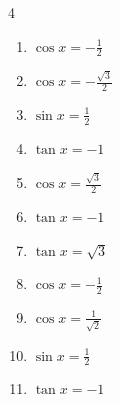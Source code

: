 \begin{multicols}{4}
\begin{enumerate}

  \item $\displaystyle \cos{x}  = -\frac{1}{2}$


\columnbreak %

  \item $\displaystyle \cos{x}  = -\frac{\sqrt{3}}{2}$


  \item $\displaystyle \sin{x}  = \frac{1}{2}$


  \item $\displaystyle \tan{x}  = -1$


  \item $\displaystyle \cos{x}  = \frac{\sqrt{3}}{2}$


  \item $\displaystyle \tan{x}  = -1$


  \item $\displaystyle \tan{x}  = \sqrt{3}$


  \item $\displaystyle \cos{x}  = -\frac{1}{2}$


  \item $\displaystyle \cos{x}  = \frac{1}{\sqrt{2}}$


  \item $\displaystyle \sin{x}  = \frac{1}{2}$


  \item $\displaystyle \tan{x}  = -1$


\end{enumerate}
\end{multicols}
